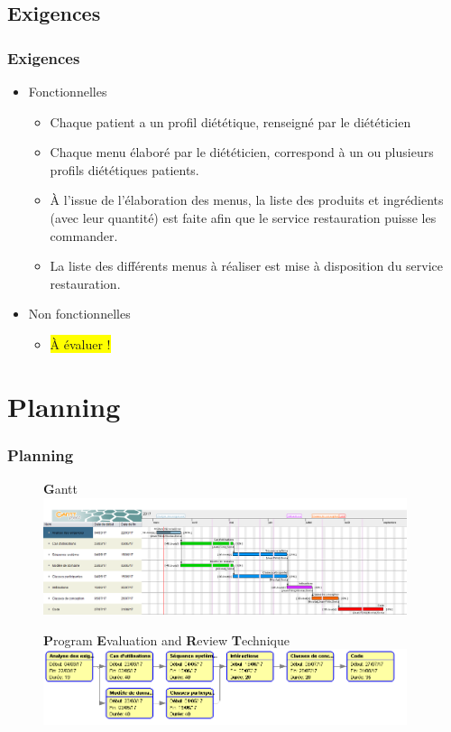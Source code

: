 \documentclass{beamer}
\begin{document}
\subsection{Exigences}
\begin{frame}
 \frametitle{Exigences}
  \begin{itemize}
    \item Fonctionnelles
    \begin{itemize}
      \item Chaque patient a un profil diététique, renseigné par le diététicien
      \item Chaque menu élaboré par le diététicien, correspond à un ou plusieurs profils diététiques patients.
      \item À l'issue de l'élaboration des menus, la liste des produits et
        ingrédients (avec leur quantité) est faite afin que le service
        restauration puisse les commander.
      \item La liste des différents menus à réaliser est mise à disposition du service restauration.
    \end{itemize}
    \item Non fonctionnelles
    \begin{itemize}
      \item \colorbox{yellow}{À évaluer !}
    \end{itemize}
  \end{itemize}
\end{frame}

\section{Planning}
\begin{frame}[label=planning]
\frametitle{Planning}
\begin{figure}[H]
\textbf{G}antt
\label{Gantt}
  \centering
      \includegraphics[width=0.95\textwidth]{Vitameal_gantt.png} %
\end{figure}

\begin{figure}[H]
\textbf{P}rogram \textbf{E}valuation and \textbf{R}eview \textbf{T}echnique
\label{PERT}
  \centering
      \includegraphics[width=0.95\textwidth]{Vitameal_pert.png} %
\end{figure}
\end{frame}
\end{document}
